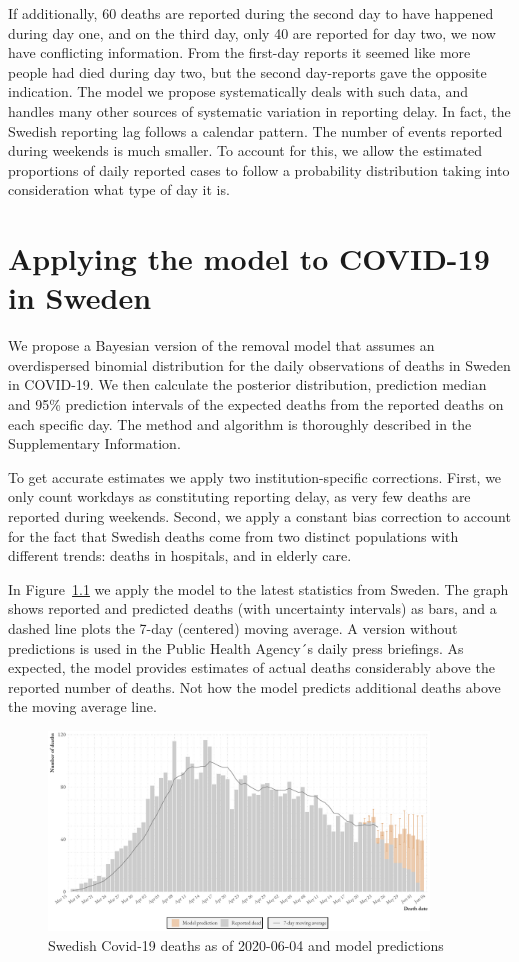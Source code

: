 \documentclass[a4paper,11pt,article,oneside,openany,american]{memoir}
\begin{document}
If additionally, 60 deaths are reported during the second day to have happened during day one, and on the third day, only 40 are reported for day two, we now have conflicting information. From the first-day reports it seemed like more people had died during day two, but the second day-reports gave the opposite indication. The model we propose systematically deals with such data, and handles many other sources of systematic variation in reporting delay. In fact, the Swedish reporting lag follows a calendar pattern. The number of events reported during weekends is much smaller. To account for this, we allow the estimated proportions of daily reported cases to follow a probability distribution taking into consideration what type of day it is.

\chapter{Applying the model to COVID-19 in Sweden}
We propose a Bayesian version of the removal model that assumes an overdispersed binomial distribution for the daily observations of deaths in Sweden in COVID-19. We then calculate the posterior distribution, prediction median and 95\% prediction intervals of the expected deaths from the reported deaths on each specific day. The method and algorithm is thoroughly described in the Supplementary Information.

To get accurate estimates we apply two institution-specific corrections. First, we only count workdays as constituting reporting delay, as very few deaths are reported during weekends. Second, we apply a constant bias correction to account for the fact that Swedish deaths come from two distinct populations with different trends: deaths in hospitals, and in elderly care.

In Figure~\ref{fig:latest_prediction} we apply the model to the latest statistics from Sweden. The graph shows reported and predicted deaths (with uncertainty intervals) as bars, and a dashed line plots the 7-day (centered) moving average. A version without predictions is used in the Public Health Agency´s daily press briefings. As expected, the model provides estimates of actual deaths considerably above the reported number of deaths. Not how the model predicts additional deaths above the moving average line.

\begin{figure}
    \centering
    \includegraphics[width=0.9\textwidth]{../plots/latest_prediction}
    \caption{Swedish Covid-19 deaths as of 2020-06-04 and model predictions}
    \label{fig:latest_prediction}
\end{figure}
\end{document}

